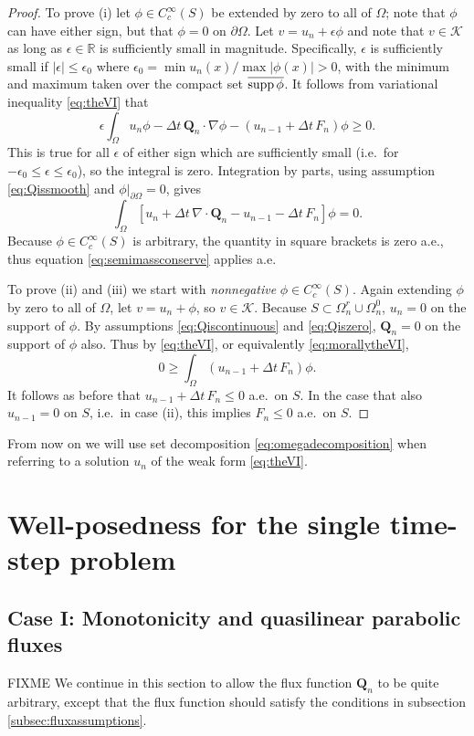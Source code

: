 \documentclass[final,leqno,onefignum,onetabnum]{siamltex1213bueler}
\newcommand\bQ{\mathbf{Q}}
\newcommand{\Div}{\nabla\cdot}
\newcommand\eps{\epsilon}
\renewcommand{\grad}{\nabla}
\newcommand\RR{\mathbb{R}}
\begin{document}
\medskip
\begin{proof}  To prove (i) let $\phi\in C_c^\infty(S)$ be extended by zero to all of $\Omega$; note that $\phi$ can have either sign, but that $\phi=0$ on $\partial\Omega$.  Let $v = u_n + \eps \phi$ and note that $v \in \mathcal{K}$ as long as $\eps\in\RR$ is sufficiently small in magnitude.  Specifically, $\eps$ is sufficiently small if $|\eps|\le \eps_0$ where $\eps_0 = \min u_n(x) / \max |\phi(x)| > 0$, with the minimum and maximum taken over the compact set $\overline{\supp \phi}$.  It follows from variational inequality \eqref{eq:theVI} that
   $$\eps \int_\Omega u_n \phi - \Delta t\,\bQ_n \cdot \grad \phi - (u_{n-1} + \Delta t\,F_n)\phi \ge 0.$$
This is true for all $\eps$ of either sign which are sufficiently small (i.e.~for $-\eps_0 \le \eps \le \eps_0$), so the integral is zero.  Integration by parts, using assumption \eqref{eq:Qissmooth} and $\phi\big|_{\partial\Omega}=0$, gives
   $$\int_\Omega \left[u_n + \Delta t\,\Div\bQ_n - u_{n-1} - \Delta t\,F_n \right]\phi = 0.$$
Because $\phi\in C_c^\infty(S)$ is arbitrary, the quantity in square brackets is zero a.e., thus equation \eqref{eq:semimassconserve} applies a.e.

To prove (ii) and (iii) we start with \emph{nonnegative} $\phi\in C_c^\infty(S)$.  Again extending $\phi$ by zero to all of $\Omega$, let $v = u_n + \phi$, so $v\in\mathcal{K}$.  Because $S\subset \Omega_n^r\cup\Omega_n^0$, $u_n=0$ on the support of $\phi$.  By assumptions \eqref{eq:Qiscontinuous} and \eqref{eq:Qiszero}, $\bQ_n=0$ on the support of $\phi$ also.  Thus by \eqref{eq:theVI}, or equivalently \eqref{eq:morallytheVI},
    $$0 \ge \int_{\Omega} \left(u_{n-1} + \Delta t\, F_n\right) \phi.$$
It follows as before that $u_{n-1} + \Delta t\, F_n \le 0$ a.e.~on $S$.  In the case that also $u_{n-1}=0$ on $S$, i.e.~in case (ii), this implies $F_n \le 0$ a.e.~on $S$.\end{proof}

\medskip
From now on we will use set decomposition \eqref{eq:omegadecomposition} when referring to a solution $u_n$ of the weak form \eqref{eq:theVI}.


\section{Well-posedness for the single time-step problem} \label{sec:wellposed}

\subsection{Case I: Monotonicity and quasilinear parabolic fluxes} \label{sec:mono}  FIXME  We continue in this section to allow the flux function $\bQ_n$ to be quite arbitrary, except that the flux function should satisfy the conditions in subsection \ref{subsec:fluxassumptions}.
\end{document}
